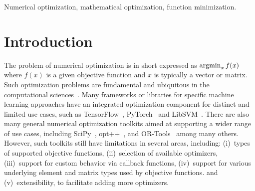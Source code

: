 \documentclass[twoside,11pt]{article}
\begin{document}
\begin{keywords}
  Numerical optimization, mathematical optimization, function minimization.
\end{keywords}


\section{Introduction}

The problem of numerical optimization is in short expressed as
$\operatornamewithlimits{argmin}_x f(x)$
where $f(x)$ is a given objective function and $x$ is typically a vector or matrix.
Such optimization problems are fundamental and ubiquitous in the computational sciences~\citep{Nocedal_2006}.
Many frameworks or libraries for specific machine learning approaches
have an integrated optimization component for distinct and limited use cases,
such as
TensorFlow~\citep{TensorFlow_arXiv_2016},
PyTorch~\citep{PyTorch_NeurIPS_2019}
and LibSVM~\citep{libsvm2011}.
There are also many general numerical optimization toolkits
aimed at supporting a wider range of use cases,
including SciPy~\citep{SciPy_arXiv_2019},
opt++~\citep{meza1994opt++},
and 
OR-Tools~\citep{ortools} among many others.
However, such toolkits still have limitations in several areas,
including:
(i)~types of supported objective functions,
(ii)~selection of available optimizers,
(iii)~support for custom behavior via callback functions,
(iv)~support for various underlying element and matrix types used by objective functions.
and
(v)~extensibility, to facilitate adding more optimizers.
\end{document}
